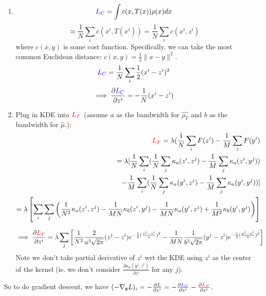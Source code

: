 \documentclass[11pt]{article}
\begin{document}
\begin{enumerate}
    \begin{enumerate}
        \item 
        $$
        \textcolor{blue}{L_C} = \int c(x,T(x)) \rho(x) dx
        $$
        $$
        \approx \frac{1}{N} \sum_i c(x^i,T(x^i))
        = \frac{1}{N} \sum_i c(x^i,z^i)
        $$
        where $c(x,y)$ is some cost function. Specifically, we can take the most common Euclidean distance: $c(x,y) = \frac{1}{2} \|x-y\|^2$.
        $$
        \textcolor{blue}{L_C} = \frac{1}{N} \sum_i \frac{1}{2}(x^i-z^i)^2
        $$
        \begin{align*}
            \implies \frac{\partial \textcolor{blue}{L_C}}{\partial z^i}
            = - \frac{1}{N}(x^i-z^i)
        \end{align*}
        
        \item Plug in KDE into $\textcolor{red}{L_F}$ (assume $a$ as the bandwidth for $\hat{\rho_T}$ and $b$ as the bandwidth for $\hat{\mu}$.):
        \begin{align*}
            \textcolor{red}{L_F} = \lambda (\frac{1}{N} \sum_i F(z^i) - \frac{1}{M} \sum_i F(y^i)\\
            =  \lambda [\frac{1}{N} \sum_i (\frac{1}{N} \sum_j \kappa_a(z^i,z^j) - \frac{1}{M} \sum_j \kappa_a(z^i,y^j))\\
            - \frac{1}{M} \sum_i (\frac{1}{N} \sum_j \kappa_a(y^i,z^j) - \frac{1}{M} \sum_j \kappa_a(y^i,y^j))]\\
            = \lambda \left[\sum_i \sum_j \left( 
            \frac{1}{N^2}\kappa_a(z^i,z^j) -  \frac{1}{MN}\kappa_b(z^i,y^j) -   \frac{1}{MN}\kappa_a(y^i,z^j) +  \frac{1}{M^2}\kappa_b(y^i,y^j)
            \right) \right]
        \end{align*}
        
        \begin{align*}
            \implies \frac{\partial \textcolor{red}{L_F}}{\partial z^i}
            = \lambda \sum_j \left[
             \frac{1}{N^2}\frac{2}{a^3\sqrt{2\pi}} (z^j-z^i) e^{-\frac{1}{2}(\frac{z^j-z^i}{a})^2} -  \frac{1}{MN}\frac{1}{b^3\sqrt{2\pi}} (y^j-z^i) e^{-\frac{1}{2}(\frac{y^j-z^i}{b})^2} \right]
        \end{align*}
        Note we don't take partial derivative of $z^i$ wrt the KDE using $z^i$ as the center of the kernel (ie. we don't consider $\frac{\partial \kappa_a(y^j,z^i)}{\partial z^i}$ for any $j$).
        \end{enumerate}
    
    So to do gradient descent, we have $(-\nabla_{\mathbf{z}} L)_i =  -\frac{\partial L}{\partial z^i} = -  \frac{\partial \textcolor{blue}{L_C}}{\partial z^i} -  \frac{\partial \textcolor{red}{L_F}}{\partial z^i}$.
    
\end{enumerate}
\end{document}
